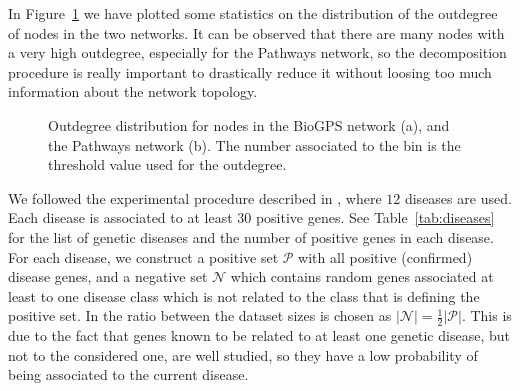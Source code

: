 \documentclass[review]{elsarticle}
\begin{document}
In Figure~\ref{fig:histograms} we have plotted some statistics on the distribution of the outdegree of nodes in the two networks. It can be observed that there are many nodes with a very high outdegree, especially for the Pathways network, so the decomposition procedure is really important to drastically reduce it without loosing too much information about the network topology.

\begin{figure}[h]
\centering
{}
\caption{\label{fig:histograms} Outdegree distribution for nodes in the BioGPS network (a), and the Pathways network (b). The number associated to the bin is the threshold value used for the outdegree.}
\end{figure}


We followed the experimental procedure described in \cite{chen2014disease}, where $12$ diseases \cite{goh2007human} are used. Each disease is associated to at least 30 positive genes. See Table~\ref{tab:diseases} for the list of genetic diseases and the number of positive genes in each disease. For each disease, we construct a positive set $\mathcal{P}$ with all positive (confirmed) disease genes, and a negative set $\mathcal{N}$ which contains random genes associated at least to one disease class which is not related to the class that is defining the positive set. In \cite{chen2014disease} the ratio between the dataset sizes is chosen as $\vert \mathcal{N} \vert = \frac{1}{2} \vert \mathcal{P} \vert$. This is due to the fact that genes known to be related to at least one genetic disease, but not to the considered one, are well studied, so they have a low probability of being associated to the current disease.
\end{document}
